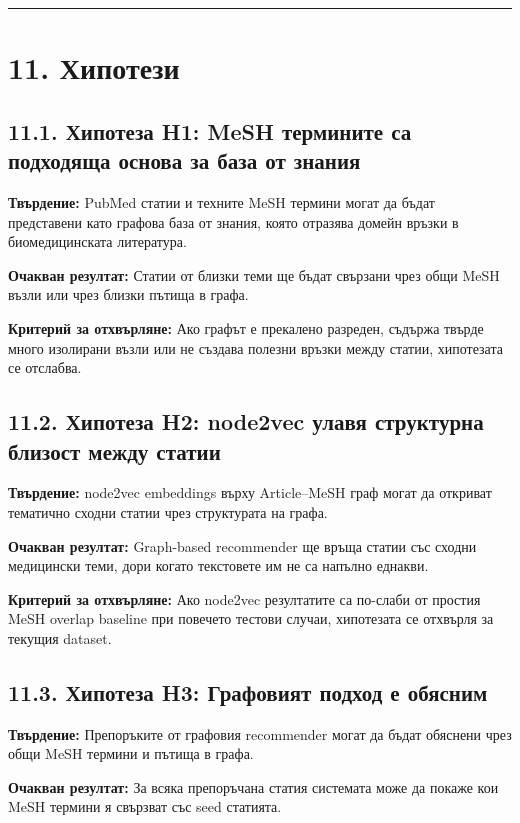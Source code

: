 \documentclass[12pt,a4paper]{article}
\begin{document}
\vspace{0.5em}\hrule\vspace{1.0em}

\section{11. Хипотези}

\subsection{11.1. Хипотеза H1: MeSH термините са подходяща основа за база от знания}

\textbf{Твърдение:} PubMed статии и техните MeSH термини могат да бъдат представени като графова база от знания, която отразява домейн връзки в биомедицинската литература.

\textbf{Очакван резултат:} Статии от близки теми ще бъдат свързани чрез общи MeSH възли или чрез близки пътища в графа.

\textbf{Критерий за отхвърляне:} Ако графът е прекалено разреден, съдържа твърде много изолирани възли или не създава полезни връзки между статии, хипотезата се отслабва.

\subsection{11.2. Хипотеза H2: node2vec улавя структурна близост между статии}

\textbf{Твърдение:} node2vec embeddings върху Article--MeSH граф могат да откриват тематично сходни статии чрез структурата на графа.

\textbf{Очакван резултат:} Graph-based recommender ще връща статии със сходни медицински теми, дори когато текстовете им не са напълно еднакви.

\textbf{Критерий за отхвърляне:} Ако node2vec резултатите са по-слаби от простия MeSH overlap baseline при повечето тестови случаи, хипотезата се отхвърля за текущия dataset.

\subsection{11.3. Хипотеза H3: Графовият подход е обясним}

\textbf{Твърдение:} Препоръките от графовия recommender могат да бъдат обяснени чрез общи MeSH термини и пътища в графа.

\textbf{Очакван резултат:} За всяка препоръчана статия системата може да покаже кои MeSH термини я свързват със seed статията.
\end{document}
